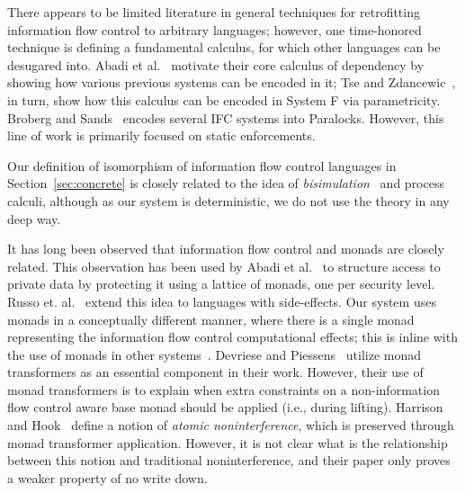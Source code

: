 \documentclass{sigplanconf}
\begin{document}
There appears to be limited literature in general techniques for retrofitting
information flow control to arbitrary languages; however, one time-honored
technique is defining a fundamental calculus, for which other languages can be
desugared into.  Abadi et al.~\cite{abadi+:core} motivate their core calculus of
dependency by showing how various previous systems can be encoded in it; Tse and
Zdancewic~\cite{Tse:Zdancewic:ICFP04}, in turn, show how this calculus can be
encoded in System F via parametricity.  Broberg and Sands~\cite{Broberg:2010}
encodes several IFC systems into Paralocks.  However, this line of work is
primarily focused on static enforcements. 

Our definition of isomorphism of information flow control languages in
Section~\ref{sec:concrete} is closely related to the idea of
\emph{bisimulation}~\cite{Milner:1989:CC:534666} and process calculi,
although as our system is deterministic, we do not use the theory in any
deep way.

It has long been observed that information flow control and monads are
closely related.  This observation has been used by Abadi et
al.~\cite{abadi+:core} to structure access to private data by protecting
it using a lattice of monads, one per security level. Russo et. al.~\cite{Russo+:Haskell08} extend this 
idea to languages with side-effects. Our system uses
monads in a conceptually different manner, where there is a single monad
representing the information flow control computational effects; this
is inline with the use of monads in other systems~\cite{Harrison05,lio,Devriese:2011}.
Devriese and Piessens~\cite{Devriese:2011} utilize monad
transformers as an essential component in their work.  However, their use
of monad transformers is to explain when extra constraints on a non-information
flow control aware base monad should be applied (i.e., during lifting).
Harrison and Hook~\cite{Harrison05} define a notion of \emph{atomic noninterference},
which is preserved through monad transformer application.  However, it is not
clear what is the relationship between this notion and traditional noninterference,
and their paper only proves a weaker property of no write down.
\end{document}
